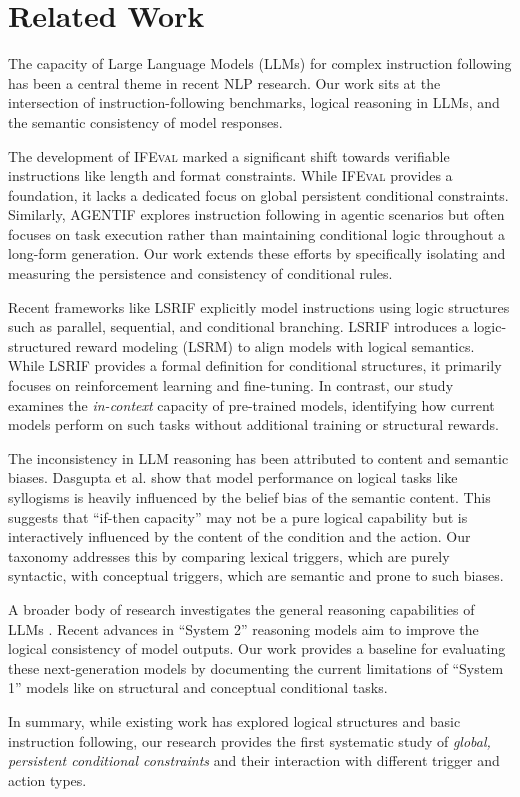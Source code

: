 \section{Related Work}
\label{sec:related_work}

The capacity of Large Language Models (LLMs) for complex instruction following has been a central theme in recent NLP research. Our work sits at the intersection of instruction-following benchmarks, logical reasoning in LLMs, and the semantic consistency of model responses.

The development of \textsc{IFEval} \cite{zhou2023ifeval} marked a significant shift towards verifiable instructions like length and format constraints. While \textsc{IFEval} provides a foundation, it lacks a dedicated focus on global persistent conditional constraints. Similarly, \textsc{AGENTIF} \cite{qi2025agentif} explores instruction following in agentic scenarios but often focuses on task execution rather than maintaining conditional logic throughout a long-form generation. Our work extends these efforts by specifically isolating and measuring the persistence and consistency of conditional rules.

Recent frameworks like \textsc{LSRIF} \cite{ren2026lsrif} explicitly model instructions using logic structures such as parallel, sequential, and conditional branching. \textsc{LSRIF} introduces a logic-structured reward modeling (LSRM) to align models with logical semantics. While \textsc{LSRIF} provides a formal definition for conditional structures, it primarily focuses on reinforcement learning and fine-tuning. In contrast, our study examines the \textit{in-context} capacity of pre-trained models, identifying how current models perform on such tasks without additional training or structural rewards.

The inconsistency in LLM reasoning has been attributed to content and semantic biases. Dasgupta et al. \cite{dasgupta2022content} show that model performance on logical tasks like syllogisms is heavily influenced by the belief bias of the semantic content. This suggests that ``if-then capacity'' may not be a pure logical capability but is interactively influenced by the content of the condition and the action. Our taxonomy addresses this by comparing lexical triggers, which are purely syntactic, with conceptual triggers, which are semantic and prone to such biases.

A broader body of research investigates the general reasoning capabilities of LLMs \cite{reasoning2025survey}. Recent advances in ``System 2'' reasoning models aim to improve the logical consistency of model outputs. Our work provides a baseline for evaluating these next-generation models by documenting the current limitations of ``System 1'' models like \gptlarge on structural and conceptual conditional tasks.

In summary, while existing work has explored logical structures and basic instruction following, our research provides the first systematic study of \textit{global, persistent conditional constraints} and their interaction with different trigger and action types.
